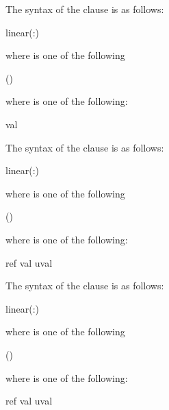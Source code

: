 \begin{cspecific}
The syntax of the  clause is as follows:
\begin{ompSyntax}
linear(\plc{linear-list[ }:\plc{ linear-step]})
\end{ompSyntax}
where  is one of the following
\begin{indentedcodelist}
()
\end{indentedcodelist}
where   is one of the following:
\begin{indentedcodelist}
val
\end{indentedcodelist}
\end{cspecific}
%
\begin{cppspecific}
The syntax of the  clause is as follows:
\begin{ompSyntax}
linear(\plc{linear-list[ }:\plc{ linear-step]})
\end{ompSyntax}
where  is one of the following
\begin{indentedcodelist}
()
\end{indentedcodelist}
where   is one of the following:
\begin{indentedcodelist}
ref
val
uval
\end{indentedcodelist}
\end{cppspecific}

\begin{fortranspecific}
The syntax of the  clause is as follows:
\begin{ompSyntax}
linear(\plc{linear-list[ }:\plc{ linear-step]})
\end{ompSyntax}
where  is one of the following
\begin{indentedcodelist}
()
\end{indentedcodelist}
where   is one of the following:
\begin{indentedcodelist}
ref
val
uval
\end{indentedcodelist}
\end{fortranspecific}


